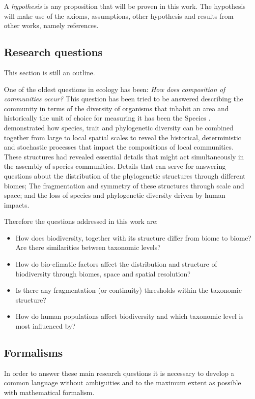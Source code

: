A {\em hypothesis} is any proposition that will be proven in this work. The hypothesis will make use of the axioms, assumptions, other hypothesis and results from other works, namely references.

\subsection{Research questions}
This section is still an outline.

One of the oldest questions in ecology has been: {\em How does composition of communities occur?} This question has been tried to be answered describing the community in terms of the diversity of organisms that inhabit an area and historically the unit of choice for measuring it has been the Species \citep{wilson-diversity}. 
\citet{pavoine-2011} demonstrated how species, trait and phylogenetic diversity can be combined together from large to local spatial scales to reveal the historical, deterministic and stochastic processes that impact the compositions of local communities.
These structures had revealed essential details that might act simultaneously in the assembly of species communities. Details that can serve for answering questions about the distribution of the phylogenetic structures through different biomes; The fragmentation and symmetry of these structures through scale and space; and the loss of species and phylogenetic diversity driven by human impacts.

Therefore the questions addressed in this work are:
\begin{itemize}
\item How does biodiversity, together with its structure differ from biome to biome? \\
Are there similarities between taxonomic levels?
\item How do bio-climatic factors affect the distribution and structure of biodiversity through biomes, space and spatial resolution?
\item Is there any fragmentation (or continuity) thresholds within the taxonomic structure?
\item How do human populations affect biodiversity and which taxonomic level is most influenced by?
\end{itemize}

\subsection{Formalisms}
In order to answer these main research questions it is necessary to develop a common language without ambiguities and to the maximum extent as possible with mathematical formalism. 

